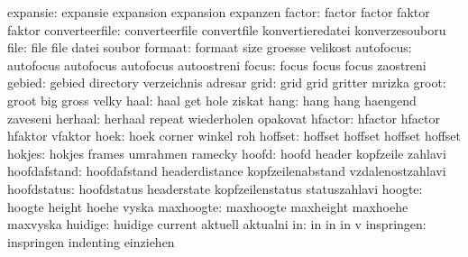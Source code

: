             expansie:  expansie             expansion            expansion
                       expanzen
              factor:  factor               factor               faktor
                       faktor
      converteerfile:  converteerfile       convertfile          konvertieredatei
                       konverzesouboru
                file:  file                 file                 datei
                       soubor
             formaat:  formaat              size                 groesse
                       velikost
           autofocus:  autofocus            autofocus            autofocus
                       autoostreni
               focus:  focus                focus                focus
                       zaostreni
              gebied:  gebied               directory            verzeichnis
                       adresar
                grid:  grid                 grid                 gritter
                       mrizka
               groot:  groot                big                  gross     
                       velky
                haal:  haal                 get                  hole
                       ziskat
                hang:  hang                 hang                 haengend
                       zaveseni 
             herhaal:  herhaal              repeat               wiederholen
                       opakovat
             hfactor:  hfactor              hfactor              hfaktor
                       vfaktor
                hoek:  hoek                 corner               winkel
                       roh
             hoffset:  hoffset              hoffset              hoffset
                       hoffset
              hokjes:  hokjes               frames               umrahmen
                       ramecky
               hoofd:  hoofd                header               kopfzeile
                       zahlavi
        hoofdafstand:  hoofdafstand         headerdistance       kopfzeilenabstand
                       vzdalenostzahlavi
         hoofdstatus:  hoofdstatus          headerstate          kopfzeilenstatus
                       statuszahlavi
              hoogte:  hoogte               height               hoehe
                       vyska
           maxhoogte:  maxhoogte            maxheight            maxhoehe
                       maxvyska
             huidige:  huidige              current              aktuell
                       aktualni
                  in:  in                   in                   in
                       v
          inspringen:  inspringen           indenting            einziehen
